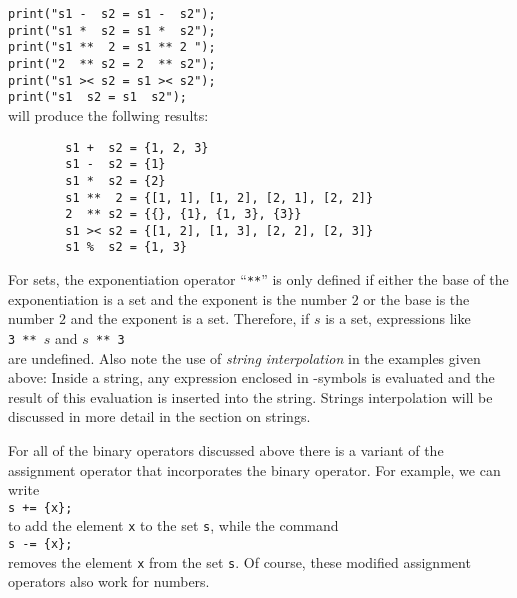 \texttt{print("s1 - \ s2 = s1 - \ s2");}
\\
\hspace*{1.3cm}
\texttt{print("s1 * \ s2 = s1 * \ s2");}
\\
\hspace*{1.3cm}
\texttt{print("s1 ** \ 2  = s1 ** 2\ ");}
\\
\hspace*{1.3cm}
\texttt{print("2 \ ** s2  = 2 \ ** s2");}
\\
\hspace*{1.3cm}
\texttt{print("s1 >< s2 = s1 >< s2");}
\\
\hspace*{1.3cm}
\texttt{print("s1  \ s2 = s1  \ s2");}
\\[0.2cm]
will produce the follwing results:
\begin{verbatim}
        s1 +  s2 = {1, 2, 3}
        s1 -  s2 = {1}
        s1 *  s2 = {2}
        s1 **  2 = {[1, 1], [1, 2], [2, 1], [2, 2]}
        2  ** s2 = {{}, {1}, {1, 3}, {3}}
        s1 >< s2 = {[1, 2], [1, 3], [2, 2], [2, 3]}
        s1 %  s2 = {1, 3}
\end{verbatim}
For sets, the exponentiation operator ``\texttt{**}'' is only defined if either the base
of the exponentiation is a set and the exponent is the number $2$ or the base is the
number $2$ and the exponent is a set.  Therefore, if $s$ is a set, expressions like
\\[0.2cm]
\hspace*{1.3cm}
\texttt{3 ** $s$} \quad and \quad \texttt{$s$ ** 3}
\\[0.2cm]
are undefined. 
Also note the use of \emph{string interpolation} in the examples given
above:  Inside a string, any expression enclosed in
-symbols is evaluated and the result of this evaluation is
inserted into the string.
Strings interpolation will be discussed in more detail in the section on strings.

For all of the binary operators discussed above there is a variant of
the assignment operator that incorporates the binary operator.  For example, we can write
\\[0.2cm]
\hspace*{1.3cm}
\texttt{s += \{x\};}
\\[0.2cm]
to add the element \texttt{x} to the set \texttt{s}, while the command
\\[0.2cm]
\hspace*{1.3cm}
\texttt{s -= \{x\};}
\\[0.2cm]
removes the element \texttt{x} from the set \texttt{s}.  Of course,
these modified assignment operators also work for numbers.
\vspace*{0.2cm}

